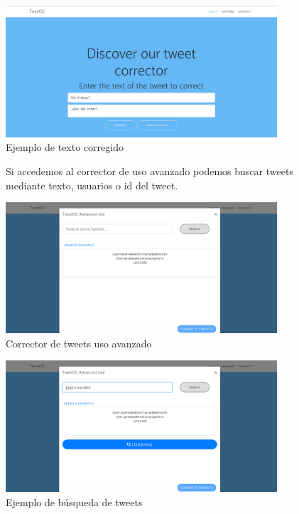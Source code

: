 \documentclass[spanish,12pt, a4paper,twoside]{paper}
\begin{document}
\begin{figure}[h]
\centering
 \includegraphics[width=0.9\textwidth]{recursos/WebUseIt_Corrected.png}
\caption{Ejemplo de texto corregido}
\label{fig:webuseitcorrected}
\end{figure}

\begin{figure}[h]
Si accedemos al corrector de uso avanzado podemos buscar tweets mediante texto, usuarios o id del tweet.
\begin{center}
 \includegraphics[width=0.9\textwidth]{recursos/WebUseIt_AdvancedUse.png}
\caption{Corrector de tweets uso avanzado}
\label{fig:webuseitadvanceduse}
\end{center}
\end{figure}

\begin{figure}[h]
\centering
 \includegraphics[width=0.9\textwidth]{recursos/WebUseIt_AdvancedUse_Loading.png}
\caption{Ejemplo de búsqueda de tweets}
\label{fig:webuseitadvanceduseloading}
\end{figure}
\end{document}
